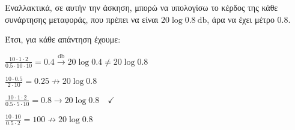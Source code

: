 \documentclass[11pt,a4paper,notitlepage,fleqn]{article}
\begin{document}
\begin{exercise}
Εναλλακτικά, σε αυτήν την άσκηση, μπορώ να υπολογίσω το κέρδος της κάθε συνάρτησης
μεταφοράς, που πρέπει να είναι \( 20\log 0.8 \SI{}{\decibel} \), άρα να έχει μέτρο \( 0.8 \).

Έτσι, για κάθε απάντηση έχουμε:
\begin{enumgreekparen}
	\item \( \displaystyle \frac{10\cdot 1\cdot 2}{0.5\cdot 10 \cdot 10} 
	= 0.4 \xrightarrow{\si{\decibel}} 20\log 0.4 \neq 20\log 0.8 \)
	\item \( \displaystyle \frac{10\cdot 0.5}{2\cdot 10} = 0.25 \nrightarrow 20\log 0.8 \)
	\item \( \displaystyle \frac{10\cdot 1\cdot 2}{0.5\cdot 5\cdot 10} = 0.8
	\rightarrow 20\log 0.8 \quad \checkmark \)
	\item \( \displaystyle \frac{10\cdot 10}{0.5\cdot 2} = 100
	\nrightarrow 20\log 0.8 \)
\end{enumgreekparen}

\end{exercise}
\end{document}
